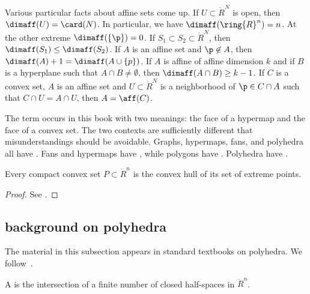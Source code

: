 \begin{remark}\label{rem:affine-background}
Various particular facts about affine sets  come up.
If $U\subset\ring{R}^N$ is open, then $\dimaff(U) = \card(N)$.  In particular,
we have
$\dimaff(\ring{R}^n) = n$.  At the other extreme $\dimaff(\{\p\}) = 0$.
If $S_1\subset S_2\subset\ring{R}^N$, then $\dimaff(S_1) \le \dimaff(S_2)$.
If $A$ is an affine set and $\p\not\in A$, then $\dimaff(A) +1 = \dimaff(A\cup\{p\})$.
If $A$ is affine of affine dimension $k$ and if $B$ is a hyperplane such that $A\cap B\ne\emptyset$, then $\dimaff (A\cap B)\ge k-1$.
If $C$ is a convex set, $A$ is an affine set and $U\subset \ring{R}^N$ 
is a neighborhood of $\p\in C\cap A$ such that $C\cap U = A\cap U$, then
$A=\aff(C)$.
\end{remark}


\begin{remark}[polysemes]\label{remark:face} 
The term  occurs in this book with two meanings: the
face of a hypermap and the face of a convex set.  The two contexts
are sufficiently different that  misunderstandings should be avoidable.
Graphs,  hypermaps, fans, and polyhedra all have .
Fans and hypermaps have , while polygons 
have .  Polyhedra have .
\end{remark}
%

\begin{lemma} Every compact
convex set $P\subset\ring{R}^n$ is the convex hull of its set of
extreme points.
\end{lemma}

\begin{proof}  See \cite[Theorem~2.6.16]{webster:1994}.
\end{proof}

\subsection{background on polyhedra}


The material in this subsection appears in standard textbooks on polyhedra.
We follow~\cite{webster:1994}.

\begin{definition}[polyhedron]
A  is the
intersection of a finite number of closed half-spaces in
$\ring{R}^n$.  
\end{definition}
%

